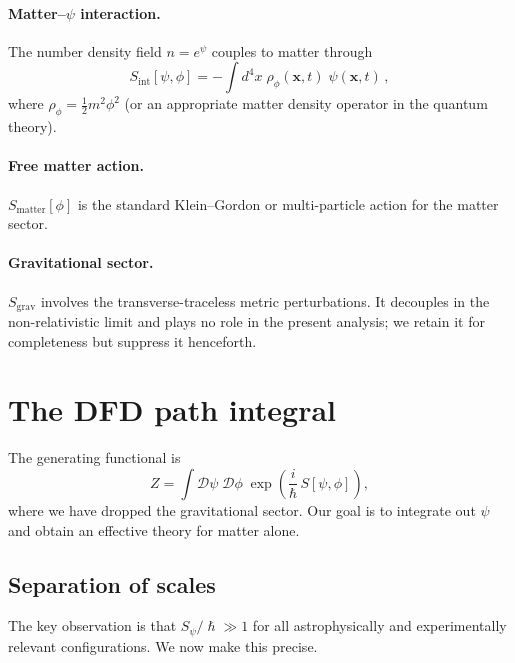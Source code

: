 \documentclass[12pt,a4paper]{article}
\theoremstyle{definition}
\theoremstyle{remark}
\newcommand{\hbar}{\hslash}
\newcommand{\Dpath}{\mathcal{D}}
\begin{document}
\paragraph{Matter--$\psi$ interaction.}
The number density field $n = e^{\psi}$ couples to matter through
\begin{equation}
\label{eq:S_int}
S_{\mathrm{int}}[\psi, \phi] = -\int d^4x\;
\rho_\phi(\mathbf{x},t)\;\psi(\mathbf{x},t)\,,
\end{equation}
where $\rho_\phi = \frac{1}{2}m^2\phi^2$ (or an appropriate matter density
operator in the quantum theory).

\paragraph{Free matter action.}
$S_{\mathrm{matter}}[\phi]$ is the standard Klein--Gordon or
multi-particle action for the matter sector.

\paragraph{Gravitational sector.}
$S_{\mathrm{grav}}$ involves the transverse-traceless metric perturbations.
It decouples in the non-relativistic limit and plays no role in the present
analysis; we retain it for completeness but suppress it henceforth.

\section{The DFD path integral}
\label{sec:path_integral}

The generating functional is
\begin{equation}
\label{eq:Z}
Z = \int \Dpath\psi\;\Dpath\phi\;
\exp\!\left(\frac{i}{\hbar}\,S[\psi,\phi]\right),
\end{equation}
where we have dropped the gravitational sector.  Our goal is to integrate
out $\psi$ and obtain an effective theory for matter alone.

\subsection{Separation of scales}

The key observation is that $S_\psi/\hbar \gg 1$ for all astrophysically
and experimentally relevant configurations.  We now make this precise.
\end{document}
